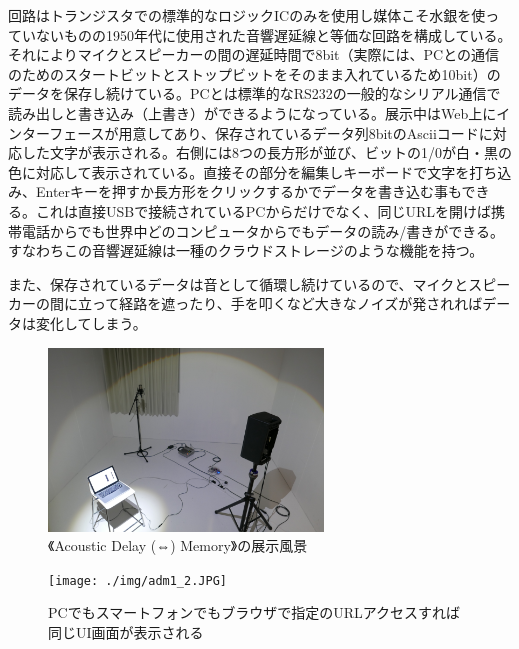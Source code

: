 \documentclass[a4paper,report]{jsbook}
\begin{document}
回路はトランジスタでの標準的なロジックICのみを使用し媒体こそ水銀を使っていないものの1950年代に使用された音響遅延線と等価な回路を構成している。それによりマイクとスピーカーの間の遅延時間で8bit（実際には、PCとの通信のためのスタートビットとストップビットをそのまま入れているため10bit）のデータを保存し続けている。PCとは標準的なRS232の一般的なシリアル通信で読み出しと書き込み（上書き）ができるようになっている。展示中はWeb上にインターフェースが用意してあり、保存されているデータ列8bitのAsciiコードに対応した文字が表示される。右側には8つの長方形が並び、ビットの1/0が白・黒の色に対応して表示されている。直接その部分を編集しキーボードで文字を打ち込み、Enterキーを押すか長方形をクリックするかでデータを書き込む事もできる。これは直接USBで接続されているPCからだけでなく、同じURLを開けば携帯電話からでも世界中どのコンピュータからでもデータの読み/書きができる。すなわちこの音響遅延線は一種のクラウドストレージのような機能を持つ。

また、保存されているデータは音として循環し続けているので、マイクとスピーカーの間に立って経路を遮ったり、手を叩くなど大きなノイズが発されればデータは変化してしまう。

\begin{no-prefix-figure-caption}

\begin{figure}[htbp]
\centering
\includegraphics[width=0.65000\textwidth]{./img/adm1_1.JPG}
\caption{《Acoustic Delay (⇔) Memory》の展示風景}
\end{figure}

\end{no-prefix-figure-caption}

\begin{no-prefix-figure-caption}

\begin{figure}[htbp]
\centering
\texttt{[image: ./img/adm1\_2.JPG]}
\caption{PCでもスマートフォンでもブラウザで指定のURLアクセスすれば同じUI画面が表示される}
\end{figure}

\end{no-prefix-figure-caption}
\end{document}
